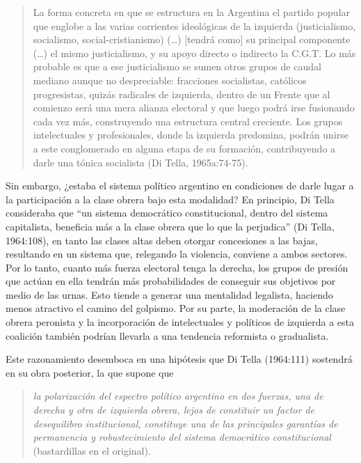 \begin{quote}
La forma concreta en que se estructura en la Argentina el partido popular que englobe a las varias corrientes ideológicas de la izquierda (justicialismo, socialismo, social-cristianismo) (\dots) [tendrá como] su principal componente (\dots) el mismo justicialismo, y su apoyo directo o indirecto la C.G.T. Lo más probable es que a ese justicialismo se sumen otros grupos de caudal mediano aunque no despreciable: fracciones socialistas, católicos progresistas, quizás radicales de izquierda, dentro de un Frente que al comienzo será una mera alianza electoral y que luego podrá irse fusionando cada vez más, construyendo una estructura central creciente. Los grupos intelectuales y profesionales, donde la izquierda predomina, podrán unirse a este conglomerado en alguna etapa de su formación, contribuyendo a darle una tónica socialista (Di Tella, 1965a:74-75).
\end{quote}

Sin embargo, ¿estaba el sistema político argentino en condiciones de darle lugar a la participación a la clase obrera bajo esta modalidad? En principio, Di Tella consideraba que ``un sistema democrático constitucional, dentro del sistema capitalista, beneficia más a la clase obrera que lo que la perjudica'' (Di Tella, 1964:108), en tanto las clases altas deben otorgar concesiones a las bajas, resultando en un sistema que, relegando la violencia, conviene a ambos sectores. Por lo tanto, cuanto más fuerza electoral tenga la derecha, los grupos de presión que actúan en ella tendrán más probabilidades de conseguir sus objetivos por medio de las urnas. Esto tiende a generar una mentalidad legalista, haciendo menos atractivo el camino del golpismo. Por su parte, la moderación de la clase obrera peronista y la incorporación de intelectuales y políticos de izquierda a esta coalición también podrían llevarla a una tendencia reformista o gradualista.

Este razonamiento desemboca en una hipótesis que Di Tella (1964:111) sostendrá en su obra posterior, la que supone que

\begin{quote}
\emph{la polarización del espectro político argentino en dos fuerzas, una de derecha y otra de izquierda obrera, lejos de constituir un factor de desequilibro institucional, constituye una de las principales garantías de permanencia y robustecimiento del sistema democrático constitucional} (bastardillas en el original).
\end{quote}

